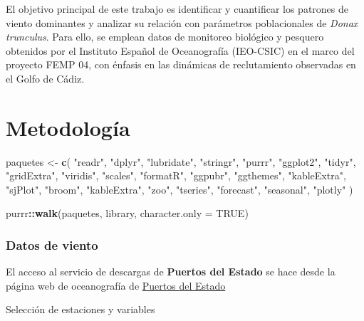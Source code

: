 \documentclass[
]{article}
\newenvironment{Shaded}{\begin{snugshade}}{\end{snugshade}}
\newcommand{\AttributeTok}[1]{\textcolor[rgb]{0.13,0.29,0.53}{#1}}
\newcommand{\ConstantTok}[1]{\textcolor[rgb]{0.56,0.35,0.01}{#1}}
\newcommand{\FunctionTok}[1]{\textcolor[rgb]{0.13,0.29,0.53}{\textbf{#1}}}
\newcommand{\NormalTok}[1]{#1}
\newcommand{\OtherTok}[1]{\textcolor[rgb]{0.56,0.35,0.01}{#1}}
\newcommand{\SpecialCharTok}[1]{\textcolor[rgb]{0.81,0.36,0.00}{\textbf{#1}}}
\newcommand{\StringTok}[1]{\textcolor[rgb]{0.31,0.60,0.02}{#1}}
\begin{document}
El objetivo principal de este trabajo es identificar y cuantificar los patrones de viento dominantes y analizar su relación con parámetros poblacionales de \emph{Donax trunculus}. Para ello, se emplean datos de monitoreo biológico y pesquero obtenidos por el Instituto Español de Oceanografía (IEO-CSIC) en el marco del proyecto FEMP 04, con énfasis en las dinámicas de reclutamiento observadas en el Golfo de Cádiz.

\newpage

\section{Metodología}\label{metodologuxeda}

\begin{Shaded}
\begin{Highlighting}[]
\NormalTok{paquetes }\OtherTok{\textless{}{-}} \FunctionTok{c}\NormalTok{(}
  \StringTok{"readr"}\NormalTok{, }\StringTok{"dplyr"}\NormalTok{, }\StringTok{"lubridate"}\NormalTok{, }\StringTok{"stringr"}\NormalTok{, }\StringTok{"purrr"}\NormalTok{,}
  \StringTok{"ggplot2"}\NormalTok{, }\StringTok{"tidyr"}\NormalTok{, }\StringTok{"gridExtra"}\NormalTok{, }\StringTok{"viridis"}\NormalTok{, }\StringTok{"scales"}\NormalTok{,}
  \StringTok{"formatR"}\NormalTok{, }\StringTok{"ggpubr"}\NormalTok{, }\StringTok{"ggthemes"}\NormalTok{, }\StringTok{"kableExtra"}\NormalTok{, }\StringTok{"sjPlot"}\NormalTok{, }
  \StringTok{"broom"}\NormalTok{, }\StringTok{"kableExtra"}\NormalTok{, }\StringTok{"zoo"}\NormalTok{, }\StringTok{"tseries"}\NormalTok{, }\StringTok{"forecast"}\NormalTok{,}
  \StringTok{"seasonal"}\NormalTok{, }\StringTok{"plotly"}
\NormalTok{  )}

\NormalTok{purrr}\SpecialCharTok{::}\FunctionTok{walk}\NormalTok{(paquetes, library, }\AttributeTok{character.only =} \ConstantTok{TRUE}\NormalTok{)}
\end{Highlighting}
\end{Shaded}

\subsubsection{Datos de viento}\label{datos-de-viento}

El acceso al servicio de descargas de \textbf{Puertos del Estado} se hace desde la página web de oceanografía de \href{http://www.puertos.es/es-es/oceanografia/Paginas/portus.aspx}{Puertos del Estado}

Selección de estaciones y variables
\end{document}
